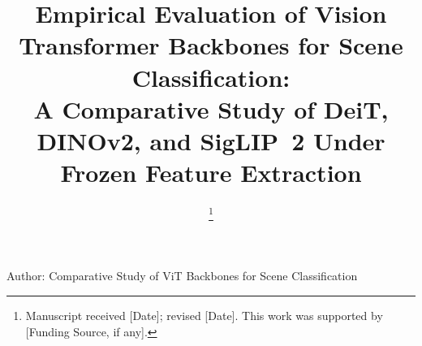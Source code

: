 \documentclass[journal]{IEEEtran}
\begin{document}
\title{Empirical Evaluation of Vision Transformer Backbones for Scene Classification:\\
A Comparative Study of DeiT, DINOv2, and SigLIP~2 Under Frozen Feature Extraction}

\author{
\thanks{Manuscript received [Date]; revised [Date]. This work was supported by [Funding Source, if any].}
}

%
{Author: Comparative Study of ViT Backbones for Scene Classification}

\maketitle
\end{document}
